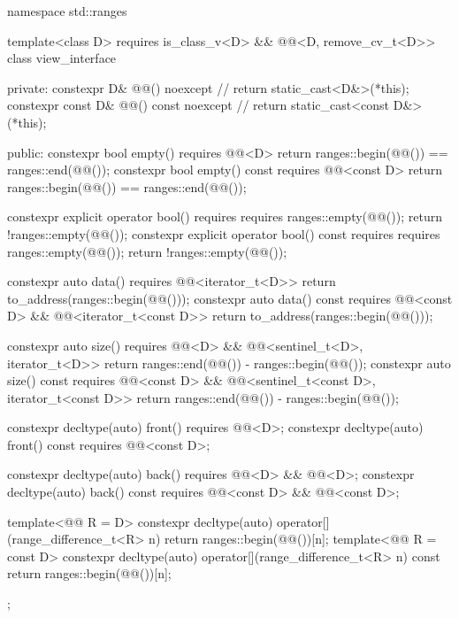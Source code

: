 %
\begin{codeblock}
namespace std::ranges {
  template<class D>
    requires is_class_v<D> && @@<D, remove_cv_t<D>>
  class view_interface {
  private:
    constexpr D& @@() noexcept {               // \expos
      return static_cast<D&>(*this);
    }
    constexpr const D& @@() const noexcept {   // \expos
      return static_cast<const D&>(*this);
    }

  public:
    constexpr bool empty() requires @@<D> {
      return ranges::begin(@@()) == ranges::end(@@());
    }
    constexpr bool empty() const requires @@<const D> {
      return ranges::begin(@@()) == ranges::end(@@());
    }

    constexpr explicit operator bool()
      requires requires { ranges::empty(@@()); } {
        return !ranges::empty(@@());
      }
    constexpr explicit operator bool() const
      requires requires { ranges::empty(@@()); } {
        return !ranges::empty(@@());
      }

    constexpr auto data() requires @@<iterator_t<D>> {
      return to_address(ranges::begin(@@()));
    }
    constexpr auto data() const
      requires @@<const D> && @@<iterator_t<const D>> {
        return to_address(ranges::begin(@@()));
      }

    constexpr auto size() requires @@<D> &&
      @@<sentinel_t<D>, iterator_t<D>> {
        return ranges::end(@@()) - ranges::begin(@@());
      }
    constexpr auto size() const requires @@<const D> &&
      @@<sentinel_t<const D>, iterator_t<const D>> {
        return ranges::end(@@()) - ranges::begin(@@());
      }

    constexpr decltype(auto) front() requires @@<D>;
    constexpr decltype(auto) front() const requires @@<const D>;

    constexpr decltype(auto) back() requires @@<D> && @@<D>;
    constexpr decltype(auto) back() const
      requires @@<const D> && @@<const D>;

    template<@@ R = D>
      constexpr decltype(auto) operator[](range_difference_t<R> n) {
        return ranges::begin(@@())[n];
      }
    template<@@ R = const D>
      constexpr decltype(auto) operator[](range_difference_t<R> n) const {
        return ranges::begin(@@())[n];
      }
  };
}
\end{codeblock}

